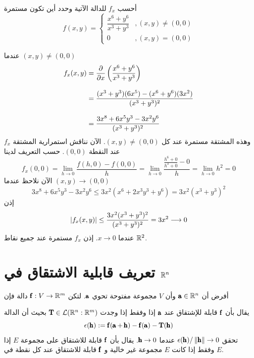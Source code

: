 \begin{example}
    أحسب $f_x$ للدالة الآتية وحدد أين تكون مستمرة 
    \[
    f(x,y)=\begin{cases}
        \dfrac{x^6+y^6}{x^3+y^3} &,(x,y)\neq(0,0)\\
        0 &, (x,y)=(0,0)
    \end{cases}
    \]
\end{example}

\begin{solution}
    عندما $(x,y)\neq(0,0)$
    \begin{align*}
        f_x(x,y)&=\dfrac{\partial}{\partial x}\left(\frac{x^6+y^6}{x^3+y^3}\right)\\[8pt]
        &=\frac{(x^3+y^3)(6x^5)-(x^6+y^6)(3x^2)}{(x^3+y^3)^2}\\[8pt]
        &=\frac{3x^8+6x^5y^3-3x^2y^6}{(x^3+y^3)^2}
    \end{align*}
    وهذه المشتقة مستمرة عند كل $(x,y)\neq(0,0)$. الآن نناقش استمرارية المشتقة $f_x$ عند النقطة $(0,0)$. حسب التعريف لدينا
    \[
    f_x(0,0)=\lim\limits_{h\to0}\frac{f(h,0)-f(0,0)}{h}=\lim\limits_{h\to0}\frac{\frac{h^6+0}{h^3+0}-0}{h}=\lim\limits_{h\to0} h^2=0
    \]
    الآن نلاحظ عندما $(x,y)\to(0,0)$ 
    \[
    3x^8+6x^5y^3-3x^2y^6\leq 3x^2(x^6+2x^3y^3+y^6)=3x^2(x^3+y^3)^2
    \]
    إذن
    \[
    \left|f_x(x,y)\right|\leq \frac{3x^2(x^3+y^3)^2}{(x^3+y^3)^2}=3x^2\longrightarrow0
    \]
    عندما $x\to0$. إذن $f_x$ مستمرة عند جميع نقاط $\mathbb{R}^2$.
\end{solution}

\section{تعريف قابلية الاشتقاق في $\mathbb{R}^n$}

\begin{definition}
    \label{def:differentiability_in_Rn}
    أفرض أن $\operatorname{\pmb{\mathrm{a}}}\in\mathbb{R}^n$ وأن $V$ مجموعة مفتوحة تحوي $\operatorname{\pmb{\mathrm{a}}}$. لتكن $\operatorname{\pmb{\mathrm{f}}}:V\to\mathbb{R}^m$ دالة فإن
\begin{tasks}
    \task[.i] يقال بأن $\operatorname{\pmb{\mathrm{f}}}$ قابلة للإشتقاق عند $\operatorname{\pmb{\mathrm{a}}}$ إذا وفقط إذا وجدت $\operatorname{\pmb{\mathrm{T}}}\in\mathcal{L}(\mathbb{R}^n:\mathbb{R}^m)$ بحيث أن الدالة 
    \[
    \epsilon(\operatorname{\pmb{\mathrm{h}}}):=\operatorname{\pmb{\mathrm{f}}}(\operatorname{\pmb{\mathrm{a}}}+\operatorname{\pmb{\mathrm{h}}})-\operatorname{\pmb{\mathrm{f}}}(\operatorname{\pmb{\mathrm{a}}})-\operatorname{\pmb{\mathrm{T}}}(\operatorname{\pmb{\mathrm{h}}})
    \]
    تحقق $\epsilon(\operatorname{\pmb{\mathrm{h}}})/\left\|\operatorname{\pmb{\mathrm{h}}}\right\|\to0$ عندما $\operatorname{\pmb{\mathrm{h}}}\to0$.
    \task[.ii] يقال بأن $\operatorname{\pmb{\mathrm{f}}}$ قابلة للاشتقاق على مجموعة $E$ إذا وفقط إذا كانت $E$ مجموعة غير خالية و $\operatorname{\pmb{\mathrm{f}}}$ قابلة للاشتقاق عند كل نقطة في $E$.
\end{tasks}
\end{definition}

